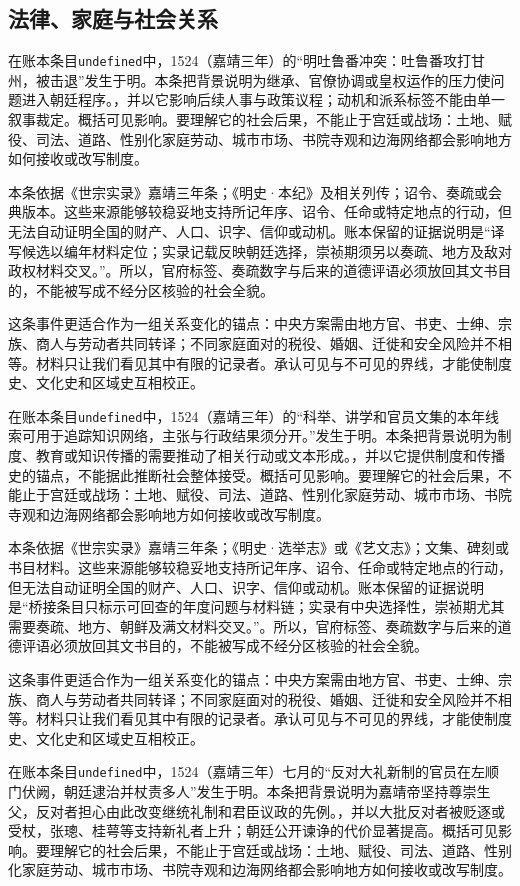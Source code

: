 \subsection{法律、家庭与社会关系}

在账本条目\texttt{undefined}中，1524（嘉靖三年）的“明吐鲁番冲突：吐鲁番攻打甘州，被击退”发生于明。本条把背景说明为继承、官僚协调或皇权运作的压力使问题进入朝廷程序。，并以它影响后续人事与政策议程；动机和派系标签不能由单一叙事裁定。概括可见影响。要理解它的社会后果，不能止于宫廷或战场：土地、赋役、司法、道路、性别化家庭劳动、城市市场、书院寺观和边海网络都会影响地方如何接收或改写制度。

本条依据《世宗实录》嘉靖三年条；《明史·本纪》及相关列传；诏令、奏疏或会典版本。这些来源能够较稳妥地支持所记年序、诏令、任命或特定地点的行动，但无法自动证明全国的财产、人口、识字、信仰或动机。账本保留的证据说明是“译写候选以编年材料定位；实录记载反映朝廷选择，崇祯期须另以奏疏、地方及敌对政权材料交叉。”。所以，官府标签、奏疏数字与后来的道德评语必须放回其文书目的，不能被写成不经分区核验的社会全貌。

这条事件更适合作为一组关系变化的锚点：中央方案需由地方官、书吏、士绅、宗族、商人与劳动者共同转译；不同家庭面对的税役、婚姻、迁徙和安全风险并不相等。材料只让我们看见其中有限的记录者。承认可见与不可见的界线，才能使制度史、文化史和区域史互相校正。

在账本条目\texttt{undefined}中，1524（嘉靖三年）的“科举、讲学和官员文集的本年线索可用于追踪知识网络，主张与行政结果须分开。”发生于明。本条把背景说明为制度、教育或知识传播的需要推动了相关行动或文本形成。，并以它提供制度和传播史的锚点，不能据此推断社会整体接受。概括可见影响。要理解它的社会后果，不能止于宫廷或战场：土地、赋役、司法、道路、性别化家庭劳动、城市市场、书院寺观和边海网络都会影响地方如何接收或改写制度。

本条依据《世宗实录》嘉靖三年条；《明史·选举志》或《艺文志》；文集、碑刻或书目材料。这些来源能够较稳妥地支持所记年序、诏令、任命或特定地点的行动，但无法自动证明全国的财产、人口、识字、信仰或动机。账本保留的证据说明是“桥接条目只标示可回查的年度问题与材料链；实录有中央选择性，崇祯期尤其需要奏疏、地方、朝鲜及满文材料交叉。”。所以，官府标签、奏疏数字与后来的道德评语必须放回其文书目的，不能被写成不经分区核验的社会全貌。

这条事件更适合作为一组关系变化的锚点：中央方案需由地方官、书吏、士绅、宗族、商人与劳动者共同转译；不同家庭面对的税役、婚姻、迁徙和安全风险并不相等。材料只让我们看见其中有限的记录者。承认可见与不可见的界线，才能使制度史、文化史和区域史互相校正。

在账本条目\texttt{undefined}中，1524（嘉靖三年）七月的“反对大礼新制的官员在左顺门伏阙，朝廷逮治并杖责多人”发生于明。本条把背景说明为嘉靖帝坚持尊崇生父，反对者担心由此改变继统礼制和君臣议政的先例。，并以大批反对者被贬逐或受杖，张璁、桂萼等支持新礼者上升；朝廷公开谏诤的代价显著提高。概括可见影响。要理解它的社会后果，不能止于宫廷或战场：土地、赋役、司法、道路、性别化家庭劳动、城市市场、书院寺观和边海网络都会影响地方如何接收或改写制度。

